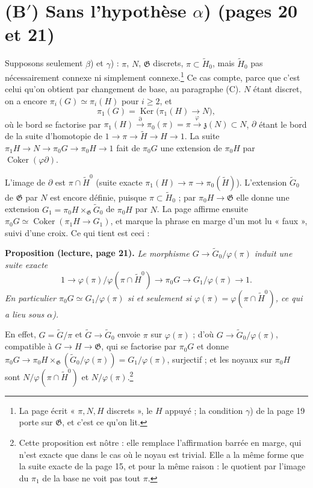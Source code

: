 \documentclass[11pt,a4paper]{article}
\begin{document}
\section*{(B$'$) Sans l'hypothèse $\alpha$) (pages 20 et 21)}

Supposons seulement $\beta$) et $\gamma$) : $\pi$, $N$, $\mathfrak{G}$
discrets, $\pi \subset \widetilde{H}_0$, mais $\widetilde{H}_0$ pas
nécessairement connexe ni simplement connexe.\footnote{La page écrit
« $\pi, N, H$ discrets », le $H$ appuyé ; la condition $\gamma$) de la page
19 porte sur $\mathfrak{G}$, et c'est ce qu'on lit.} Ce cas compte, parce que
c'est celui qu'on obtient par changement de base, au paragraphe (C). $N$ étant
discret, on a encore $\pi_i(G) \simeq \pi_i(H)$ pour $i \geqslant 2$, et
\[
  \pi_1(G) = \operatorname{Ker}\bigl(\pi_1(H) \to N\bigr) ,
\]
où le bord se factorise par $\pi_1(H) \xrightarrow{\partial} \pi_0(\pi) = \pi
\xrightarrow{\varphi} \mathfrak{z}(N) \subset N$, $\partial$ étant le bord de
la suite d'homotopie de $1 \to \pi \to \widetilde{H} \to H \to 1$. La suite
$\pi_1 H \to N \to \pi_0 G \to \pi_0 H \to 1$ fait de $\pi_0 G$ une extension
de $\pi_0 H$ par $\operatorname{Coker}(\varphi \partial)$.

L'image de $\partial$ est $\pi \cap \widetilde{H}^0$ (suite exacte
$\pi_1(H) \to \pi \to \pi_0(\widetilde{H})$). L'extension
$\widetilde{G}_0$ de $\mathfrak{G}$ par $N$ est encore définie, puisque
$\pi \subset \widetilde{H}_0$ ; par $\pi_0 H \to \mathfrak{G}$ elle donne
une extension $G_1 = \pi_0 H \times_{\mathfrak{G}} \widetilde{G}_0$ de
$\pi_0 H$ par $N$. La page affirme ensuite $\pi_0 G \simeq
\operatorname{Coker}(\pi_1 H \to G_1)$, et marque la phrase en marge d'un mot
lu « faux », suivi d'une croix. Ce qui tient est ceci :

\textbf{Proposition (lecture, page 21).} \emph{Le morphisme $G \to
\widetilde{G}_0/\varphi(\pi)$ induit une suite exacte
\[
  1 \longrightarrow \varphi(\pi) / \varphi(\pi \cap \widetilde{H}^0)
  \longrightarrow \pi_0 G \longrightarrow G_1 / \varphi(\pi)
  \longrightarrow 1 .
\]
En particulier $\pi_0 G \simeq G_1 / \varphi(\pi)$ si et seulement si
$\varphi(\pi) = \varphi(\pi \cap \widetilde{H}^0)$, ce qui a lieu sous
$\alpha$).}

En effet, $G = \widetilde{G}/\pi$ et $\widetilde{G} \to \widetilde{G}_0$
envoie $\pi$ sur $\varphi(\pi)$ ; d'où $G \to \widetilde{G}_0/\varphi(\pi)$,
compatible à $G \to H \to \mathfrak{G}$, qui se factorise par $\pi_0 G$ et
donne $\pi_0 G \to \pi_0 H \times_{\mathfrak{G}}
(\widetilde{G}_0/\varphi(\pi)) = G_1/\varphi(\pi)$, surjectif ; et les
noyaux sur $\pi_0 H$ sont $N/\varphi(\pi \cap \widetilde{H}^0)$ et
$N/\varphi(\pi)$.\footnote{Cette proposition est nôtre : elle remplace
l'affirmation barrée en marge, qui n'est exacte que dans le cas où le noyau
est trivial. Elle a la même forme que la suite exacte de la page 15, et pour
la même raison : le quotient par l'image du $\pi_1$ de la base ne voit pas
tout $\pi$.}
\end{document}
